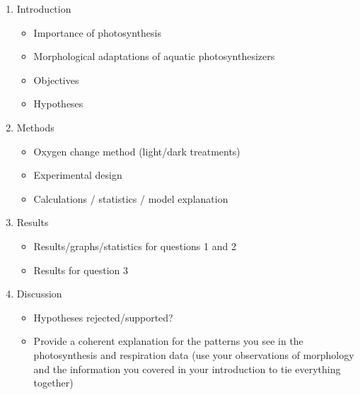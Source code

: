 \documentclass[11pt,]{article}
\providecommand{\tightlist}{%
\setlength{\itemsep}{0pt}\setlength{\parskip}{0pt}}
\begin{document}
\begin{enumerate}
\def\labelenumi{\arabic{enumi}.}
\tightlist
\item
  Introduction

  \begin{itemize}
  \tightlist
  \item
    Importance of photosynthesis
  \item
    Morphological adaptations of aquatic photosynthesizers
  \item
    Objectives
  \item
    Hypotheses
  \end{itemize}
\item
  Methods

  \begin{itemize}
  \tightlist
  \item
    Oxygen change method (light/dark treatments)
  \item
    Experimental design
  \item
    Calculations / statistics / model explanation
  \end{itemize}
\item
  Results

  \begin{itemize}
  \tightlist
  \item
    Results/graphs/statistics for questions 1 and 2
  \item
    Results for question 3
  \end{itemize}
\item
  Discussion

  \begin{itemize}
  \tightlist
  \item
    Hypotheses rejected/supported?
  \item
    Provide a coherent explanation for the patterns you see in the
    photosynthesis and respiration data (use your observations of
    morphology and the information you covered in your introduction to
    tie everything together)
  \end{itemize}
\end{enumerate}

\pagebreak

\renewcommand{\arraystretch}{2}
\end{document}
